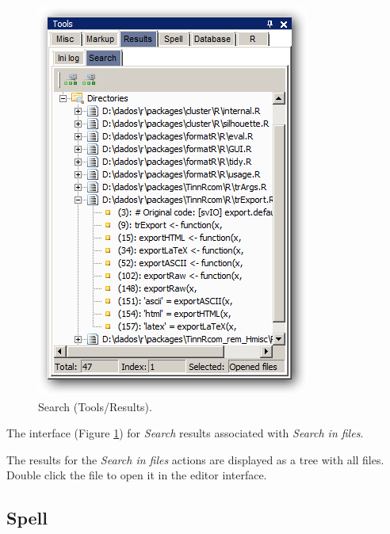 \begin{figure}[h!]
  \includegraphics[scale=0.35]{./res/tools_results_search.png}
  \caption{Search (Tools/Results).}
  \label{fig:tools_results_search}
\end{figure}

The interface
(Figure \ref{fig:tools_results_search})
for \textit{Search} results associated with \textit{Search in files}.

The results for the \textit{Search in files} actions are displayed
as a tree with all files. Double click the file to open it in
the editor interface.


\hypertarget{working_tools_spell}{}
\subsection{Spell}

